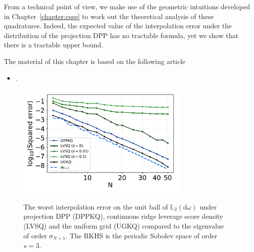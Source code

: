 \documentclass[twoside,11pt]{book}
\numberwithin{theorem}{chapter}
\numberwithin{definition}{chapter}
\numberwithin{proposition}{chapter}
\numberwithin{corollary}{chapter}
\numberwithin{example}{chapter}
\numberwithin{lemma}{chapter}
\numberwithin{assumption}{chapter}
\numberwithin{equation}{chapter}
\numberwithin{figure}{chapter}
\DeclareMathOperator{\DPP}{\mathrm{DPP}}
\DeclareMathOperator{\EX}{\mathbb{E}}
\DeclareMathOperator{\X}{\mathcal{X}}
\begin{document}
From a technical point of view, we make use of the geometric intuitions developed in Chapter~\ref{chapter:cssp} to work out the theoretical analysis of these quadratures. Indeed, the expected value of the interpolation error under the distribution of the projection DPP
has no tractable formula, yet we show that there is a tractable upper bound.

The material of this chapter
is based on the following article

\begin{itemize}
\item {}.
\end{itemize}








\begin{figure}
\centering
\includegraphics[width=0.75\textwidth]{img/neurips/Sobolev/suponunitball_interpolation_pSobolev_s_3_randomvectors_2000_fig_1.pdf}\\
\caption{The worst interpolation error on the unit ball of $\mathbb{L}_{2}(\mathrm{d}\omega)$ under projection DPP (DPPKQ), continuous ridge leverage score density (LVSQ) and the uniform grid (UGKQ) compared to the eigenvalue of order $\sigma_{N+1}$. The RKHS is the periodic Sobolev space of order $s=3$.
\label{fig:introduction_pDPP_results_pSobolev_exp_2}}
\end{figure}
\end{document}
